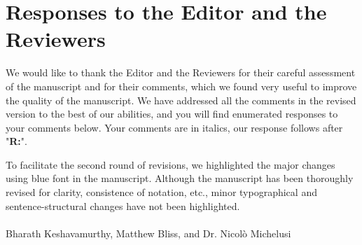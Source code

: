 \documentclass[12pt, draftcls, onecolumn]{IEEEtran}
\theoremstyle{plain}
\theoremstyle{definition}
\theoremstyle{remark}
\begin{document}
\section*{Responses to the Editor and the Reviewers}
We would like to thank the Editor and the Reviewers for their careful assessment of the manuscript and for their comments, which we found very useful to improve the quality of the manuscript. We have addressed all the comments in the revised version to the best of our abilities, and you will find enumerated responses to your comments below. Your comments are in italics, our response follows after "{\bf R:}".

To facilitate the second round of revisions, we highlighted the major changes using {\color{blue}blue font} in the manuscript. Although the manuscript has been thoroughly revised for clarity, consistence of notation, etc., minor typographical and sentence-structural changes have not been highlighted.\\

\\
Bharath Keshavamurthy, Matthew Bliss, and Dr. Nicol\`{o} Michelusi

\clearpage
\end{document}
